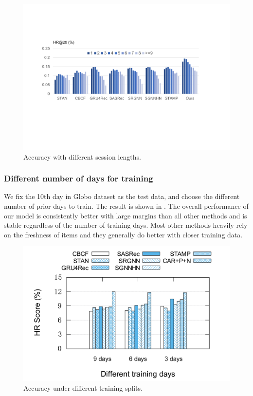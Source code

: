 \begin{figure}[th]
  \centering
  \includegraphics[width=0.95\columnwidth]{fig/input_len.pdf}
  \caption{Accuracy with different session lengths.}
  \label{fig:inputlen}
\end{figure}

\subsubsection{Different number of days for training}
\label{sec:robo}
We fix the 10th day in Globo dataset as the test data, and choose the different number of prior days to train. The result is shown in . The overall performance of our model is consistently 
better with large margins than all other methods and is stable regardless of the number of training days. 
Most other methods heavily rely on the freshness of items and they generally 
do better with closer training data. 

\begin{figure}[th]
  \centering
  \includegraphics[width=0.8\columnwidth]{fig/diff_day_len.pdf}
  \caption{Accuracy under different training splits.}
  \label{fig:trainlen}
\end{figure}


